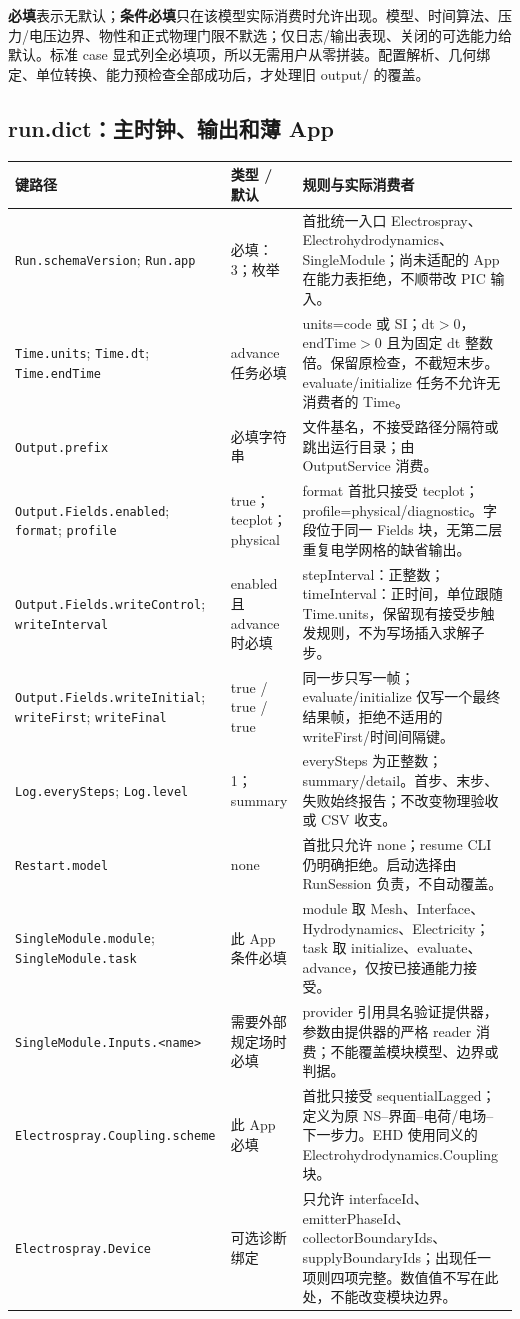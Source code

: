 \documentclass[UTF8,a4paper,11pt,fontset=fandol]{ctexart}
\numberwithin{equation}{section}
\newcommand{\code}[1]{\nolinkurl{#1}}
\begin{document}
\textbf{必填}表示无默认；\textbf{条件必填}只在该模型实际消费时允许出现。模型、时间算法、压力/电压边界、物性和正式物理门限不默选；仅日志/输出表现、关闭的可选能力给默认。标准 case 显式列全必填项，所以无需用户从零拼装。配置解析、几何绑定、单位转换、能力预检查全部成功后，才处理旧 output/ 的覆盖。

\subsection{run.dict：主时钟、输出和薄 App}
\begin{longtable}{@{}P{.36\textwidth}P{.23\textwidth}P{.35\textwidth}@{}}
\toprule 键路径 & 类型 / 默认 & 规则与实际消费者\\\midrule\endhead
\code{Run.schemaVersion}; \code{Run.app} & 必填：3；枚举 & 首批统一入口 Electrospray、Electrohydrodynamics、SingleModule；尚未适配的 App 在能力表拒绝，不顺带改 PIC 输入。\\
\code{Time.units}; \code{Time.dt}; \code{Time.endTime} & advance 任务必填 & units=code 或 SI；dt$>0$，endTime$>0$ 且为固定 dt 整数倍。保留原检查，不截短末步。evaluate/initialize 任务不允许无消费者的 Time。\\
\code{Output.prefix} & 必填字符串 & 文件基名，不接受路径分隔符或跳出运行目录；由 OutputService 消费。\\
\code{Output.Fields.enabled}; \code{format}; \code{profile} & true；tecplot；physical & format 首批只接受 tecplot；profile=physical/diagnostic。字段位于同一 Fields 块，无第二层重复电学网格的缺省输出。\\
\code{Output.Fields.writeControl}; \code{writeInterval} & enabled 且 advance 时必填 & stepInterval：正整数；timeInterval：正时间，单位跟随 Time.units，保留现有接受步触发规则，不为写场插入求解子步。\\
\code{Output.Fields.writeInitial}; \code{writeFirst}; \code{writeFinal} & true / true / true & 同一步只写一帧；evaluate/initialize 仅写一个最终结果帧，拒绝不适用的 writeFirst/时间间隔键。\\
\code{Log.everySteps}; \code{Log.level} & 1；summary & everySteps 为正整数；summary/detail。首步、末步、失败始终报告；不改变物理验收或 CSV 收支。\\
\code{Restart.model} & none & 首批只允许 none；resume CLI 仍明确拒绝。启动选择由 RunSession 负责，不自动覆盖。\\
\code{SingleModule.module}; \code{SingleModule.task} & 此 App 条件必填 & module 取 Mesh、Interface、Hydrodynamics、Electricity；task 取 initialize、evaluate、advance，仅按已接通能力接受。\\
\code{SingleModule.Inputs.<name>} & 需要外部规定场时必填 & provider 引用具名验证提供器，参数由提供器的严格 reader 消费；不能覆盖模块模型、边界或判据。\\
\code{Electrospray.Coupling.scheme} & 此 App 必填 & 首批只接受 sequentialLagged；定义为原 NS--界面--电荷/电场--下一步力。EHD 使用同义的 Electrohydrodynamics.Coupling 块。\\
\code{Electrospray.Device} & 可选诊断绑定 & 只允许 interfaceId、emitterPhaseId、collectorBoundaryIds、supplyBoundaryIds；出现任一项则四项完整。数值值不写在此处，不能改变模块边界。\\
\bottomrule
\end{longtable}
\end{document}
